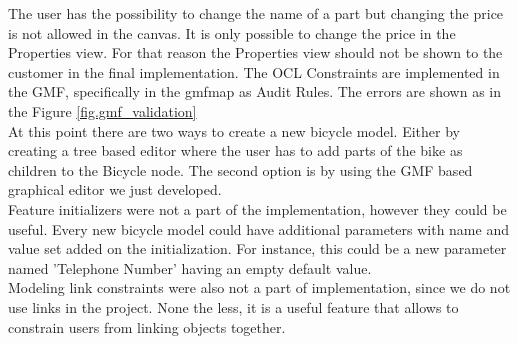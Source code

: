 \noindent The user has the possibility to change the name of a part but changing
the price is not allowed in the canvas. It is only possible to change the
price in the Properties view. For that reason the Properties view should not be
shown to the customer in the final implementation. The OCL Constraints are
implemented in the GMF, specifically in the gmfmap as Audit Rules. The errors are shown as in the Figure \ref{fig.gmf_validation}\\

\noindent At this point there are two ways to create a new bicycle model. Either
by creating a tree based editor where the user has to add parts of the bike as
children to the Bicycle node. The second option is by using the GMF based
graphical editor we just developed. \\

\noindent Feature initializers were not a part of the implementation, however
they could be useful. Every new bicycle model could have
additional parameters with name and value set added on the initialization. For instance, this could be a new parameter named
'Telephone Number' having an empty default value.\\ Modeling link
constraints were also not a part of implementation, since we do not use links in the
project. None the less, it is a useful feature that allows to constrain users
from linking objects together. \\
